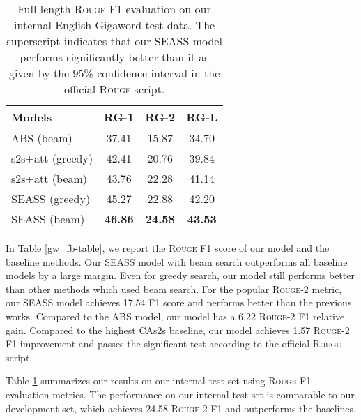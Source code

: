 \documentclass[11pt,a4paper]{article}
\newcommand{\ourModelName}{SEASS}
\begin{document}
\begin{table}[h]
	\begin{center}
		\begin{tabular}{lccc}
			\toprule
			\bf Models & \bf RG-1 & \bf RG-2 & \bf RG-L \\ 
			\midrule
			ABS (beam) & 37.41\significant{} & 15.87\significant{} & 34.70\significant{} \\
			s2s+att (greedy) & 42.41\significant{} & 20.76\significant{} & 39.84\significant{} \\
			s2s+att (beam) & 43.76\significant{} & 22.28\significant{} & 41.14\significant{} \\
			\hline
			\ourModelName{} (greedy) & 45.27 & 22.88 & 42.20\\
			\ourModelName{} (beam) & \textbf{46.86} & \textbf{24.58}  & \textbf{43.53} \\
			
			\bottomrule
		\end{tabular}
	\end{center}
	\caption{\label{gw-table} Full length \textsc{Rouge} F1 evaluation on our internal English Gigaword test data. The superscript \significant{}  indicates that our \ourModelName{} model performs significantly better than it as given by the 95\% confidence interval in the official \textsc{Rouge} script. }
\end{table}

In Table \ref{gw_fb-table}, we report the \textsc{Rouge} F1 score of our model and the baseline methods.
Our \ourModelName{} model with beam search outperforms all baseline models by a large margin.
Even for greedy search, our model still performs better than other methods which used beam search.
For the popular \textsc{Rouge}-2 metric, our \ourModelName{} model achieves 17.54 F1 score and performs better than the previous works.
Compared to the ABS model, our model has a 6.22 \textsc{Rouge}-2 F1 relative gain.
Compared to the highest CAs2s baseline, our model achieves 1.57 \textsc{Rouge}-2 F1 improvement and passes the significant test according to the official \textsc{Rouge} script.


Table \ref{gw-table} summarizes our results on our internal test set using \textsc{Rouge} F1 evaluation metrics.
The performance on our internal test set is comparable to our development set, which achieves 24.58 \textsc{Rouge}-2 F1 and outperforms the baselines.
\end{document}
